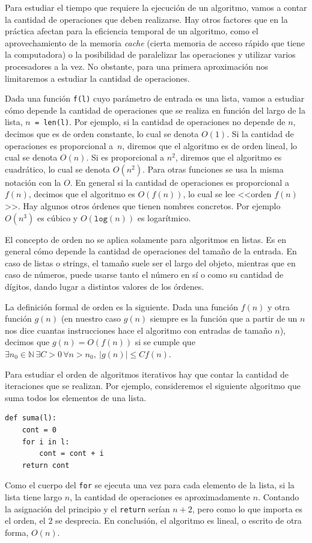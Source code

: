 \documentclass[a4paper, 12pt]{report}
\newcommand{\N}{\mathbb{N}}
\theoremstyle{definition}
\begin{document}
Para estudiar el tiempo que requiere la ejecución de un algoritmo, vamos a contar la cantidad de operaciones que deben realizarse. Hay otros factores que en la práctica afectan para la eficiencia temporal de un algoritmo, como el aprovechamiento de la memoria {\sl cache} (cierta memoria de acceso rápido que tiene la computadora) o la posibilidad de paralelizar las operaciones y utilizar varios procesadores a la vez. No obstante, para una primera aproximación nos limitaremos a estudiar la cantidad de operaciones.

Dada una función {\tt f(l)} cuyo parámetro de entrada es una lista, vamos a estudiar cómo depende la cantidad de operaciones que se realiza en función del largo de la lista, {\tt $n$~=~len(l)}. Por ejemplo, si la cantidad de operaciones no depende de $n$, decimos que es de orden constante, lo cual se denota $O(1)$. Si la cantidad de operaciones es proporcional a~$n$, diremos que el algoritmo es de orden lineal, lo cual se denota $O(n)$. Si es proporcional a $n^2$, diremos que el algoritmo es cuadrático, lo cual se denota $O(n^2)$. Para otras funciones se usa la misma notación con la $O$. En general si la cantidad de operaciones es proporcional a $f(n)$, decimos que el algoritmo es $O(f(n))$, lo cual se lee <<orden $f(n)$>>. Hay algunos otros órdenes que tienen nombres concretos. Por ejemplo $O(n^3)$ es cúbico y $O(\mathtt{log}(n))$ es logarítmico.

El concepto de orden no se aplica solamente para algoritmos en listas. Es en general cómo depende la cantidad de operaciones del tamaño de la entrada. En caso de listas o strings, el tamaño suele ser el largo del objeto, mientras que en caso de números, puede usarse tanto el número en sí o como su cantidad de dígitos, dando lugar a distintos valores de los órdenes.

La definición formal de orden es la siguiente. Dada una función $f(n)$ y otra función $g(n)$ (en nuestro caso $g(n)$ siempre es la función que a partir de un $n$ nos dice cuantas instrucciones hace el algoritmo con entradas de tamaño $n$), decimos que $g(n) = O(f(n))$ si se cumple que $\exists n_0\in\N\,\exists C>0\,\forall n > n_0,~|g(n)| \leq Cf(n)$.

Para estudiar el orden de algoritmos iterativos hay que contar la cantidad de iteraciones que se realizan. Por ejemplo, consideremos el siguiente algoritmo que suma todos los elementos de una lista.
\begin{verbatim}
def suma(l):
    cont = 0
    for i in l:
        cont = cont + i
    return cont
\end{verbatim}
Como el cuerpo del {\tt for} se ejecuta una vez para cada elemento de la lista, si la lista tiene largo $n$, la cantidad de operaciones es aproximadamente $n$. Contando la asignación del principio y el {\tt return} serían $n+2$, pero como lo que importa es el orden, el $2$ se desprecia. En conclusión, el algoritmo es lineal, o escrito de otra forma, $O(n)$.
\end{document}
